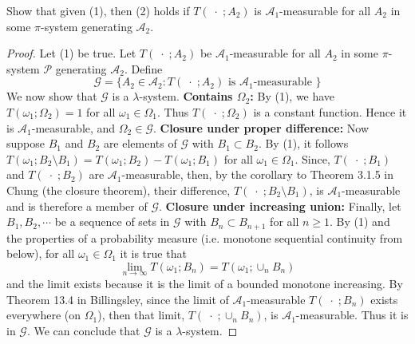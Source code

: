 \documentclass[letterpaper, 12pt]{article}
\newcommand{\cA}{\mathcal{A}}
\newcommand{\sG}{\mathscr{G}}
\newcommand{\sP}{\mathscr{P}}
\begin{document}
\begin{enumerate}
Show that given (1), then (2) holds if $T(\;\cdot\; ;A_2)$ is $\cA_1$-measurable for all $A_2$ in some $\pi$-system generating $\cA_2$.

\begin{proof}
Let (1) be true. Let $T(\;\cdot\; ;A_2)$ be $\cA_1$-measurable for all $A_2$ in some $\pi$-system $\sP$ generating $\cA_2$. 
Define 
\[
\sG = \{  A_2 \in \cA_2 : T( \;\cdot \;; A_2) \text{ is $\cA_1$-measurable }\}
\]
We now show that $\sG$ is a $\lambda$-system. 
\textbf{Contains $\Omega_2$:} By (1), we have $T(\omega_1; \Omega_2) = 1$ for all $\omega_1 \in \Omega_1$. 
Thus $T( \; \cdot \; ; \Omega_2)$ is a constant function. Hence it is $\cA_1$-measurable, and $\Omega_2 \in \sG$. 
\textbf{Closure under proper difference:} Now suppose $B_1$ and $B_2$ are elements of $\sG$ with $B_1 \subset B_2$. 
By (1), it follows $T(\omega_1; B_2 \setminus B_1) = T(\omega_1; B_2) - T(\omega_1; B_1)$ for all $\omega_1 \in \Omega_1$. 
Since, $T( \; \cdot \; ; B_1)$ and $T( \; \cdot \; ; B_2)$ are $\cA_1$-measurable, then, by the corollary to Theorem 3.1.5 in Chung (the closure theorem), their difference, $T(\; \cdot\; ; B_2 \setminus B_1)$, is $\cA_1$-measurable and is therefore a member of $\sG$. 
\textbf{Closure under increasing union:} Finally, let $B_1, B_2, \cdots$ be a sequence of sets in $\sG$ with $B_n \subset B_{n+1}$ for all $n \geq 1$. 
By (1) and the properties of a probability measure (i.e. monotone sequential continuity from below), for all $\omega_1 \in \Omega_1$ it is true that
\[
\lim_{n \to \infty} T(\omega_1; B_n) = T(\omega_1; \cup_n B_n)
\]
and the limit exists because it is the limit of a bounded monotone increasing.
By Theorem 13.4 in Billingsley, since the limit of $\cA_1$-measurable $T(\; \cdot \; ; B_n)$ exists everywhere (on $\Omega_1$), then that limit, $T(\; \cdot \; ; \cup_n B_n)$, is $\cA_1$-measurable. 
Thus it is in $\sG$. We can conclude that $\sG$ is a $\lambda$-system.


\end{proof}
\end{enumerate}
\end{document}

